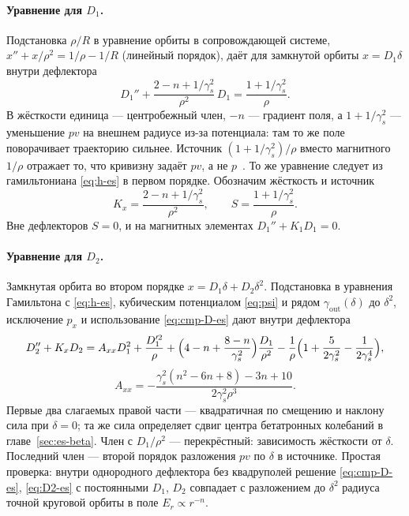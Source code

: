 \paragraph{Уравнение для $D_1$.}
Подстановка $\rho/R$ в уравнение орбиты в сопровождающей системе, $x''+x/\rho^2=1/\rho-1/R$ (линейный порядок), даёт для замкнутой орбиты $x=D_1\delta$ внутри дефлектора
\begin{equation}
\label{eq:cmp-D-es}
D_1''+\frac{2-n+1/\gamma_s^2}{\rho^2}\,D_1
=\frac{1+1/\gamma_s^2}{\rho}.
\end{equation}
В жёсткости единица --- центробежный член, $-n$ --- градиент поля, а $1+1/\gamma_s^2$ --- уменьшение $pv$ на внешнем радиусе из-за потенциала: там то же поле поворачивает траекторию сильнее. Источник $(1+1/\gamma_s^2)/\rho$ вместо магнитного $1/\rho$ отражает то, что кривизну задаёт $pv$, а не $p$~\cite{Mane2008,Mane2012}. То же уравнение следует из гамильтониана \eqref{eq:h-es} в первом порядке. Обозначим жёсткость и источник
\begin{equation*}
K_x=\frac{2-n+1/\gamma_s^2}{\rho^2},
\qquad
S=\frac{1+1/\gamma_s^2}{\rho}.
\end{equation*}
Вне дефлекторов $S=0$, и на магнитных элементах $D_1''+K_1D_1=0$.

\paragraph{Уравнение для $D_2$.}
Замкнутая орбита во втором порядке $x=D_1\delta+D_2\delta^2$. Подстановка в уравнения Гамильтона с \eqref{eq:h-es}, кубическим потенциалом \eqref{eq:psi} и рядом $\gamma_{\mathrm{out}}(\delta)$ до $\delta^2$, исключение $p_x$ и использование \eqref{eq:cmp-D-es} дают внутри дефлектора
\begin{equation}
\label{eq:D2-es}
D_2''+K_xD_2=A_{xx}D_1^2+\frac{D_1'^2}{\rho}
+\Bigl(4-n+\frac{8-n}{\gamma_s^2}\Bigr)\frac{D_1}{\rho^2}
-\frac{1}{\rho}\Bigl(1+\frac{5}{2\gamma_s^2}-\frac{1}{2\gamma_s^4}\Bigr),
\end{equation}
\begin{equation}
\label{eq:Axx-def}
A_{xx}=-\frac{\gamma_s^2(n^2-6n+8)-3n+10}{2\gamma_s^2\rho^3}.
\end{equation}
Первые два слагаемых правой части --- квадратичная по смещению и наклону сила при $\delta=0$; та же сила определяет сдвиг центра бетатронных колебаний в главе~\ref{sec:es-beta}. Член с $D_1/\rho^2$ --- перекрёстный: зависимость жёсткости от $\delta$. Последний член --- второй порядок разложения $pv$ по $\delta$ в источнике. Простая проверка: внутри однородного дефлектора без квадруполей решение \eqref{eq:cmp-D-es}, \eqref{eq:D2-es} с постоянными $D_1$, $D_2$ совпадает с разложением до $\delta^2$ радиуса точной круговой орбиты в поле $E_r\propto r^{-n}$.

